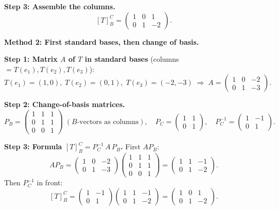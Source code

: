 \documentclass[a4paper,12pt]{article}
\begin{document}
\textbf{Step 3: Assemble the columns.}
\[
[T]_B^C = \begin{pmatrix} 1 & 0 & 1 \\ 0 & 1 & -2 \end{pmatrix}.
\]

\bigskip

\textbf{Method 2: First standard bases, then change of basis.}

\textbf{Step 1: Matrix $A$ of $T$ in standard bases} (columns $= T(e_1), T(e_2), T(e_3)$):
\[
T(e_1) = (1, 0),\; T(e_2) = (0, 1),\; T(e_3) = (-2, -3)
\;\Rightarrow\;
A = \begin{pmatrix} 1 & 0 & -2 \\ 0 & 1 & -3 \end{pmatrix}.
\]

\textbf{Step 2: Change-of-basis matrices.}
\[
P_B = \begin{pmatrix} 1 & 1 & 1 \\ 0 & 1 & 1 \\ 0 & 0 & 1 \end{pmatrix} \;(\text{$B$-vectors as columns}), \quad
P_C = \begin{pmatrix} 1 & 1 \\ 0 & 1 \end{pmatrix}, \quad
P_C^{-1} = \begin{pmatrix} 1 & -1 \\ 0 & 1 \end{pmatrix}.
\]

\textbf{Step 3: Formula $[T]_B^C = P_C^{-1}\, A\, P_B$.} First $A P_B$:
\[
A P_B = \begin{pmatrix} 1 & 0 & -2 \\ 0 & 1 & -3 \end{pmatrix}\begin{pmatrix} 1 & 1 & 1 \\ 0 & 1 & 1 \\ 0 & 0 & 1 \end{pmatrix}
= \begin{pmatrix} 1 & 1 & -1 \\ 0 & 1 & -2 \end{pmatrix}.
\]
Then $P_C^{-1}$ in front:
\[
[T]_B^C = \begin{pmatrix} 1 & -1 \\ 0 & 1 \end{pmatrix}\begin{pmatrix} 1 & 1 & -1 \\ 0 & 1 & -2 \end{pmatrix}
= \begin{pmatrix} 1 & 0 & 1 \\ 0 & 1 & -2 \end{pmatrix}.
\]
\end{document}
